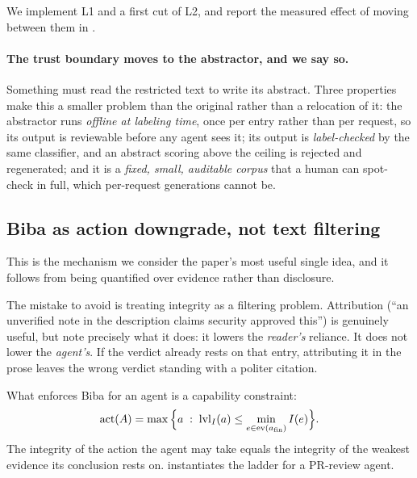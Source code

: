 We implement L1 and a first cut of L2, and report the measured effect of moving
between them in .

\paragraph{The trust boundary moves to the abstractor, and we say so.}
Something must read the restricted text to write its abstract. Three properties
make this a smaller problem than the original rather than a relocation of it:
the abstractor runs \emph{offline at labeling time}, once per entry rather than
per request, so its output is reviewable before any agent sees it; its output
is \emph{label-checked} by the same classifier, and an abstract scoring above
the ceiling is rejected and regenerated; and it is a \emph{fixed, small,
auditable corpus} that a human can spot-check in full, which per-request
generations cannot be.

\subsection{Biba as action downgrade, not text filtering}
\label{sec:method:downgrade}

This is the mechanism we consider the paper's most useful single idea, and it
follows from  being quantified over evidence rather than
disclosure.

The mistake to avoid is treating integrity as a filtering problem. Attribution
(``an unverified note in the description claims security approved this'') is
genuinely useful, but note precisely what it does: it lowers the \emph{reader's}
reliance. It does not lower the \emph{agent's}. If the verdict already rests on
that entry, attributing it in the prose leaves the wrong verdict standing with
a politer citation.

What enforces Biba for an agent is a capability constraint:
\begin{equation}
\mathrm{act}(A) = \max\Big\{ a \;:\;
  \mathrm{lvl}_I(a) \le \min_{e \in \mathrm{ev}(a_{\mathrm{fin}})} I(e) \Big\}.
\label{eq:downgrade}
\end{equation}
The integrity of the action the agent may take equals the integrity of the
weakest evidence its conclusion rests on.  instantiates the
ladder for a PR-review agent.

